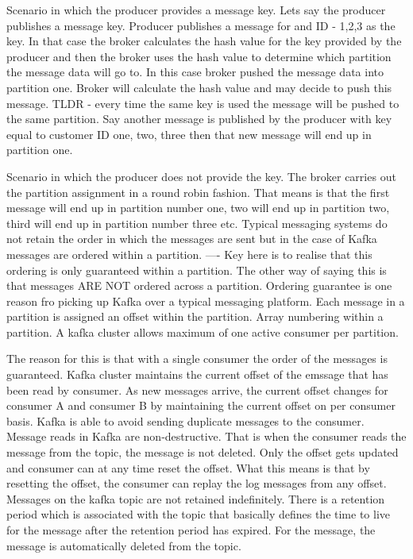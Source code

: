 Scenario in which the producer provides a message key.
Lets say the producer publishes a message key.
Producer publishes a message for and ID - 1,2,3 as the key.
In that case the broker calculates the hash value for the key provided by the producer and then the broker uses the hash value to determine which partition the message data will go to.
In this case broker pushed the message data into partition one.
Broker will calculate the hash value and may decide to push this message.
TLDR - every time the same key is used the message will be pushed to the same partition.
Say another message is published by the producer with key equal to customer ID one, two, three then that new message will end up in partition one.

Scenario in which the producer does not provide the key.
The broker carries out the partition assignment in a round robin fashion.
That means is that the first message will end up in partition number one, two will end up in partition two, third will end up in partition number three etc.
Typical messaging systems do not retain the order in which the messages are sent but in the case of Kafka messages are ordered within a partition.
---- Key here is to realise that this ordering is only guaranteed within a partition.
The other way of saying this is that messages ARE NOT ordered across a partition.
Ordering guarantee is one reason fro picking up Kafka over a typical messaging platform.
Each message in a partition is assigned an offset within the partition. Array numbering within a partition.
A kafka cluster allows maximum of one active consumer per partition.

The reason for this is that with a single consumer the order of the messages is guaranteed.
Kafka cluster maintains the current offset of the emssage that has been read by consumer.
As new messages arrive, the current offset changes for consumer A and consumer B by maintaining the current offset on per consumer basis.
Kafka is able to avoid sending duplicate messages to the consumer.
Message reads in Kafka are non-destructive.
That is when the consumer reads the message from the topic, the message is not deleted. Only the offset gets updated and consumer can at any time reset the offset.
What this means is that by resetting the offset, the consumer can replay the log messages from any offset.
Messages on the kafka topic are not retained indefinitely.
There is a retention period which is associated with the topic that basically defines the time to live for the message after the retention period has expired.
For the message, the message is automatically deleted from the topic.

